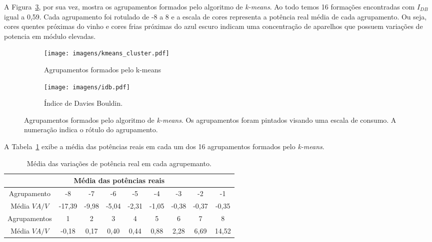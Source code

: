 A Figura~\ref{fig:agrup_kmeans}, por sua vez, mostra os agrupamentos
formados pelo algoritmo de \emph{k-means}. Ao todo temos 16 formações
encontradas com $I_{DB}$ igual a 0,59. Cada agrupamento foi rotulado
de -8 a 8 e a escala de cores representa a potência real média de cada
agrupamento.  Ou seja, cores quentes próximas do vinho e cores frias
próximas do azul escuro indicam uma concentração de aparelhos que
possuem variações de potencia em módulo elevadas.
	
\begin{figure}[!htb]
  \begin{center}
    \begin{subfigure}[c]{7.5cm}
      \texttt{[image: imagens/kmeans\_cluster.pdf]}
      \caption{Agrupamentos formados pelo k-means}
      \label{fig:kmeans_cluster}
    \end{subfigure}
    \begin{subfigure}[c]{7.5cm}
      \texttt{[image: imagens/idb.pdf]}
      \caption{Índice de Davies Bouldin.}
      \label{fig:bouldin}
    \end{subfigure}
  \end{center}
\caption[Agrupamentos formados pelo algoritmo de k-means.]{
Agrupamentos formados pelo algoritmo de \emph{k-means}. Os
agrupamentos foram pintados visando uma escala de consumo. A numeração
indica o rótulo do agrupamento.}
\label{fig:agrup_kmeans}
\end{figure}

A Tabela~\ref{tab:media_pot_real}  exibe a média das potências reais
em cada um dos 16 agrupamentos formados pelo \emph{k-means}.	
	

\begin{table}[!htb]
\centering
\begin{tabular}{ccccccccc}
\hline \hline
\multicolumn{9}{c}{Média das potências reais}\\
\hline \hline
Agrupamento & -8 & -7 & -6 & -5 & -4 & -3 & -2 & -1 \\
Média $VA/V$ & -17,39 & -9,98 & -5,04 & -2,31 & -1,05 & -0,38 & -0,37
& -0,35\\
\hline
Agrupamentos & 1 & 2 & 3 & 4 & 5 & 6 & 7 & 8\\
Média $VA/V$ & -0,18 & 0,17 & 0,40 & 0,44 & 0,88 & 2,28 & 6,69 &
14,52\\
\hline
\hline
\end{tabular}
\caption{Média das variações de potência real em cada agrupemanto.}
\label{tab:media_pot_real}
\end{table} 


